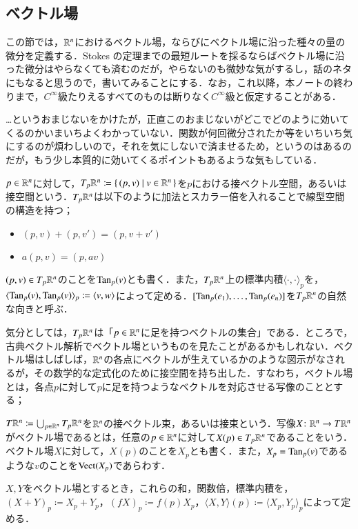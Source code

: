 \subsection{ベクトル場}

この節では，$\mathbb{R}^n$におけるベクトル場，ならびにベクトル場に沿った種々の量の微分を定義する．Stokes の定理までの最短ルートを採るならばベクトル場に沿った微分はやらなくても済むのだが，やらないのも微妙な気がするし，話のネタにもなると思うので，書いてみることにする．なお，これ以降，本ノートの終わりまで，$C^\infty$級たりえるすべてのものは断りなく$C^\infty$級と仮定することがある．


\begin{que}[**]
…というおまじないをかけたが，正直このおまじないがどこでどのように効いてくるのかいまいちよくわかっていない．関数が何回微分されたか等をいちいち気にするのが煩わしいので，それを気にしないで済ませるため，というのはあるのだが，もう少し本質的に効いてくるポイントもあるような気もしている．
\end{que}

\begin{defi}
$p \in \mathbb{R}^n$に対して，$T_p \mathbb{R}^n \coloneqq \set{(p,v)| v \in \mathbb{R}^n}$を$p$における接ベクトル空間，あるいは接空間という．$T_p \mathbb{R}^n$は以下のように加法とスカラー倍を入れることで線型空間の構造を持つ；
\begin{itemize}
\item $(p, v) + (p, v') = (p, v+v')$
\item $a(p,v) = (p, av)$
\end{itemize}
$(p,v) \in T_p \mathbb{R}^n$のことを$\operatorname{Tan}_p(v)$とも書く．また，$T_p \mathbb{R}^n$上の標準内積$\langle \cdot, \cdot \rangle_p$を，$\langle \operatorname{Tan}_p(v), \operatorname{Tan}_p(v) \rangle_p \coloneqq \langle v, w \rangle$によって定める．$[\operatorname{Tan}_p(e_1), \dots, \operatorname{Tan}_p(e_n)]$を$T_p \mathbb{R}^n$の自然な向きと呼ぶ．
\end{defi}

気分としては，$T_p \mathbb{R}^n$は「$p \in \mathbb{R}^n$に足を持つベクトルの集合」である．ところで，古典ベクトル解析でベクトル場というものを見たことがあるかもしれない．ベクトル場はしばしば，$\mathbb{R}^n$の各点にベクトルが生えているかのような図示がなされるが，その数学的な定式化のために接空間を持ち出した．すなわち，ベクトル場とは，各点$p$に対して$p$に足を持つようなベクトルを対応させる写像のこととする；

\begin{defi}
$T\mathbb{R}^n \coloneqq \bigcup_{p \in \mathbb{R}^n} T_p \mathbb{R}^n$を$\mathbb{R}^n$の接ベクトル束，あるいは接束という．写像$X \colon \mathbb{R}^n \to T \mathbb{R}^n$がベクトル場であるとは，任意の$p \in \mathbb{R}^n$に対して$X(p) \in T_p \mathbb{R}^n$であることをいう．ベクトル場$X$に対して，$X(p)$のことを$X_p$とも書く．また，$X_p = \operatorname{Tan}_p(v)$であるような$v$のことを$\operatorname{Vect}(X_p)$であらわす．

$X,Y$をベクトル場とするとき，これらの和，関数倍，標準内積を，$(X+Y)_p \coloneqq X_p + Y_p$，$(fX)_p \coloneqq f(p) X_p$，$\langle X, Y \rangle (p) \coloneqq \langle X_p, Y_p \rangle_p$によって定める．
\end{defi}

